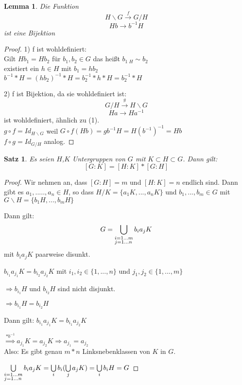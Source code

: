 \documentclass[12pt]{scrartcl}%
\newtheorem{thm}{Satz}
\newtheorem{lemma}{Lemma}
\theoremstyle{definition}
\theoremstyle{remark}
\begin{document}
\begin{lemma} 
Die Funktion
$$  	H\backslash G   \xrightarrow{f} G/H $$
$$	Hb \rightarrow b^{-1}H$$
ist eine Bijektion

\end{lemma}

\begin{proof}
1) f ist wohldefiniert:\\
Gilt $Hb_{1}=Hb_{2}$ für $b_{1},b_{2} \in G$
das heißt $b_{1} {_{\ H}}\sim b_{2}$ \\
existiert ein $h \in H$ mit $b_1 = hb_2$ \\
$b^{-1}*H = (hb_2)^{-1}*H = b_{2}^{-1}*h*H =  b_{2}^{-1}*H$ 

2) f ist Bijektion, da sie wohldefiniert ist:\\
$$  	G/H   \xrightarrow{g} H\backslash G $$
$$	Ha \rightarrow Ha^{-1}$$
ist wohldefiniert, ähnlich zu (1).\\
$g \circ f = Id_{H \backslash G}$ weil $G \circ f(Hb) = gb^{-1}H=H(b^{-1})^{-1}=Hb$ \\
$f \circ g = Id_{G \slash H}$ analog.
\end{proof}

\begin{thm}
Es seien $H$,$K$ Untergruppen von $G$ mit $K \subset H \subset G$. Dann gilt: $$[G:K]=[H:K]*[G:H]$$
\end{thm}

\begin{proof}
Wir nehmen an, dass $[G:H]=m$ und $[H:K]=n$ endlich sind. 
Dann gibt es $a_1,.....,a_n \in H$, so dass
$H/K=\{ a_1K,...,a_nK\}$ und $b_1,...,b_m \in G$ mit
$G\backslash H=\{ b_1H,...,b_mH\}$

Dann gilt:
$$G=\bigcup\limits_{\begin{subarray}{1}i=1...m \\ j=1...n\end{subarray}} b_ia_jK$$
mit $b_ia_jK$ paarweise disunkt.

$b_{i_{1}}a_{j_{1}}K=b_{i_{2}}a_{j_{2}}K$ mit $i_1,i_2 \in \{1,...,n \}$ und $j_1,j_2 \in \{1,...,m \}$

$\Rightarrow b_{i_{1}}H$ und $b_{i_{2}}H$ sind nicht disjunkt.

$\Rightarrow b_{i_{1}}H=b_{i_{2}}H$

Dann gilt: $b_{i_{1}}a_{j_{1}}K=b_{i_{1}}a_{j_{2}}K$

$\overset{*b^{-1}}{\Rightarrow} a_{j_{1}}K=a_{j_{2}}K \Rightarrow a_{j_{1}}=a_{j_{2}}$ \\
Also: Es gibt genau $m*n$ Linksnebenklassen von $K$ in $G$.

$\bigcup\limits_{\begin{subarray}{1}i=1...m \\ j=1...n\end{subarray}} b_ia_jK =  \bigcup\limits_i b_i( \bigcup\limits_j a_jK)= \bigcup\limits_i b_iH=G$

\end{proof}
\end{document}
